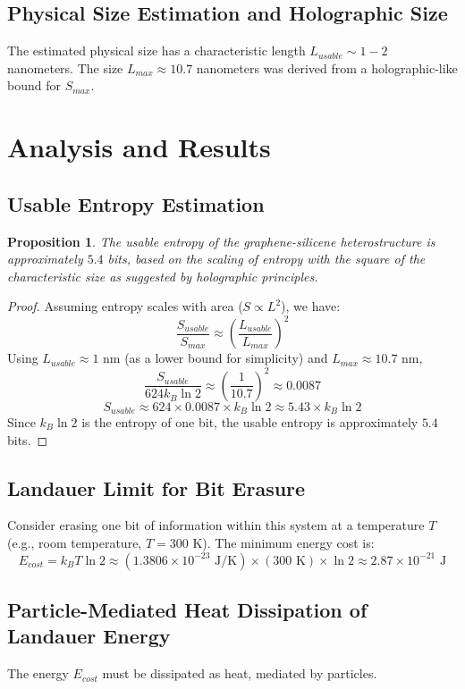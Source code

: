 \documentclass{article}
\newtheorem{proposition}{Proposition}
\begin{document}
		\subsection{Physical Size Estimation and Holographic Size}
		The estimated physical size has a characteristic length $L_{usable} \sim 1-2$ nanometers. The size $L_{max} \approx 10.7$ nanometers was derived from a holographic-like bound for $S_{max}$.
		
		\section{Analysis and Results}
		
		\subsection{Usable Entropy Estimation}
		\begin{proposition}
			The usable entropy of the graphene-silicene heterostructure is approximately $5.4$ bits, based on the scaling of entropy with the square of the characteristic size as suggested by holographic principles.
		\end{proposition}
		\begin{proof}
			Assuming entropy scales with area ($S \propto L^2$), we have:
			$$ \frac{S_{usable}}{S_{max}} \approx \left( \frac{L_{usable}}{L_{max}} \right)^2 $$
			Using $L_{usable} \approx 1$ nm (as a lower bound for simplicity) and $L_{max} \approx 10.7$ nm,
			$$ \frac{S_{usable}}{624 k_B \ln 2} \approx \left( \frac{1}{10.7} \right)^2 \approx 0.0087 $$
			$$ S_{usable} \approx 624 \times 0.0087 \times k_B \ln 2 \approx 5.43 \times k_B \ln 2 $$
			Since $k_B \ln 2$ is the entropy of one bit, the usable entropy is approximately $5.4$ bits.
		\end{proof}
		
		\subsection{Landauer Limit for Bit Erasure}
		Consider erasing one bit of information within this system at a temperature $T$ (e.g., room temperature, $T = 300$ K). The minimum energy cost is:
		$$ E_{cost} = k_B T \ln 2 \approx (1.3806 \times 10^{-23} \text{ J/K}) \times (300 \text{ K}) \times \ln 2 \approx 2.87 \times 10^{-21} \text{ J} $$
		
		\subsection{Particle-Mediated Heat Dissipation of Landauer Energy}
		The energy $E_{cost}$ must be dissipated as heat, mediated by particles.
		
\end{document}
